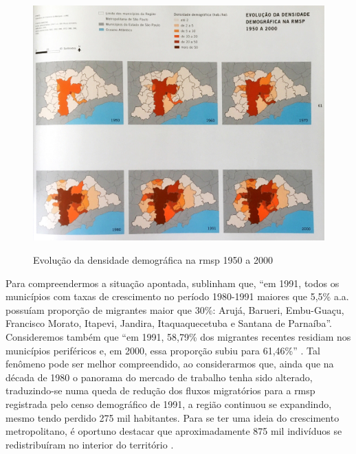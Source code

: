 	\begin{figure}[h]
		\centering
		\caption{Evolução da densidade demográfica na \gls{rmsp} 1950 a 2000}
		\includegraphics[width=\linewidth,keepaspectratio]{img/spmetrop_pag061}
		\label{spmetrop_pag061}
	\end{figure}
	
	Para compreendermos a situação apontada,  sublinham que, ``em 1991, todos os municípios com taxas de crescimento no período 1980-1991 maiores que 5,5\% a.a. possuíam proporção de migrantes maior que	30\%: Arujá, Barueri, Embu-Guaçu, Francisco Morato, Itapevi, Jandira, Itaquaquecetuba e Santana de Parnaíba''. Consideremos também que ``em 1991, 58,79\% dos migrantes recentes residiam nos municípios periféricos e, em 2000, essa proporção subiu para 61,46\%'' \cite[p.32]{pasternak2005a}. Tal fenômeno pode ser melhor compreendido, ao considerarmos que, ainda que na década de 1980 o panorama do mercado de trabalho tenha sido alterado, traduzindo-se numa queda de redução dos fluxos migratórios para a \gls{rmsp} registrada pelo censo demográfico de 1991, a região continuou se expandindo, mesmo tendo perdido 275 mil habitantes. Para se ter uma ideia do crescimento metropolitano, é oportuno destacar que aproximadamente 875 mil indivíduos se redistribuíram no interior do território \cite[p.42]{meyer2004}.

